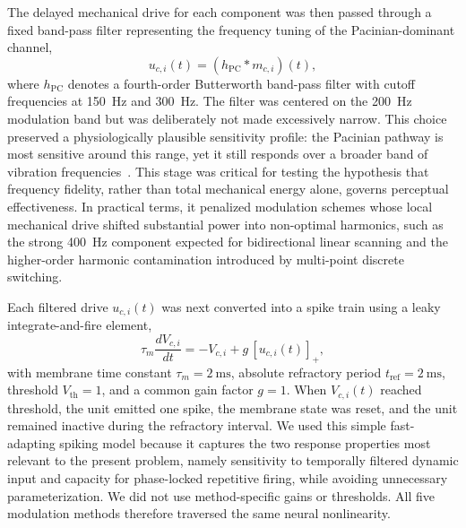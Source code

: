 \documentclass[pdflatex, sn-nature]{sn-jnl}
\theoremstyle{thmstyleone}%
\theoremstyle{thmstyletwo}%
\theoremstyle{thmstylethree}%
\begin{document}
The delayed mechanical drive for each component was then passed through a fixed band-pass filter representing the frequency tuning of the Pacinian-dominant channel,
\begin{equation}
    u_{c,i}(t)=(h_{\mathrm{PC}} * m_{c,i})(t),
\end{equation}
where $h_{\mathrm{PC}}$ denotes a fourth-order Butterworth band-pass filter with cutoff frequencies at \qty{150}{\hertz} and \qty{300}{\hertz}. The filter was centered on the \qty{200}{\hertz} modulation band but was deliberately not made excessively narrow. This choice preserved a physiologically plausible sensitivity profile: the Pacinian pathway is most sensitive around this range, yet it still responds over a broader band of vibration frequencies~\citep{mountcastleNeuralBasisSense1967, talbotSenseFluttervibrationComparison1968a, bolanowskiFourChannelsMediate1988, johnsonRolesFunctionsCutaneous2001}. This stage was critical for testing the hypothesis that frequency fidelity, rather than total mechanical energy alone, governs perceptual effectiveness. In practical terms, it penalized modulation schemes whose local mechanical drive shifted substantial power into non-optimal harmonics, such as the strong \qty{400}{\hertz} component expected for bidirectional linear scanning and the higher-order harmonic contamination introduced by multi-point discrete switching.

Each filtered drive $u_{c,i}(t)$ was next converted into a spike train using a leaky integrate-and-fire element,
\begin{equation}
    \tau_m\frac{dV_{c,i}}{dt}=-V_{c,i}+g\,[u_{c,i}(t)]_{+},
\end{equation}
with membrane time constant $\tau_m=\qty{2}{\milli\second}$, absolute refractory period $t_{\mathrm{ref}}=\qty{2}{\milli\second}$, threshold $V_{\mathrm{th}}=1$, and a common gain factor $g=1$. When $V_{c,i}(t)$ reached threshold, the unit emitted one spike, the membrane state was reset, and the unit remained inactive during the refractory interval. We used this simple fast-adapting spiking model because it captures the two response properties most relevant to the present problem, namely sensitivity to temporally filtered dynamic input and capacity for phase-locked repetitive firing, while avoiding unnecessary parameterization. We did not use method-specific gains or thresholds. All five modulation methods therefore traversed the same neural nonlinearity.
\end{document}
